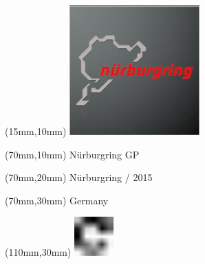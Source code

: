 \null\newpage
\begin{textblock*}{50mm}(15mm,10mm)%
\includegraphics[width=50mm]{LG/2015-05-20_00089.png}
\end{textblock*}
\begin{textblock*}{130mm}(70mm,10mm)%
{\fontsize{20}{20}\selectfont Nürburgring GP}\\
\end{textblock*}
\begin{textblock*}{120mm}(70mm,20mm)%
{\fontsize{16}{16}\selectfont Nürburgring / 2015}\\
\end{textblock*}
\begin{textblock*}{120mm}(70mm,30mm)%
{\fontsize{12}{12}\selectfont Germany}
\end{textblock*}
\begin{textblock*}{30mm}(110mm,30mm)%
\centering
\includegraphics[height=15mm]{icons/fa-rotate-right.pdf}
\end{textblock*}
